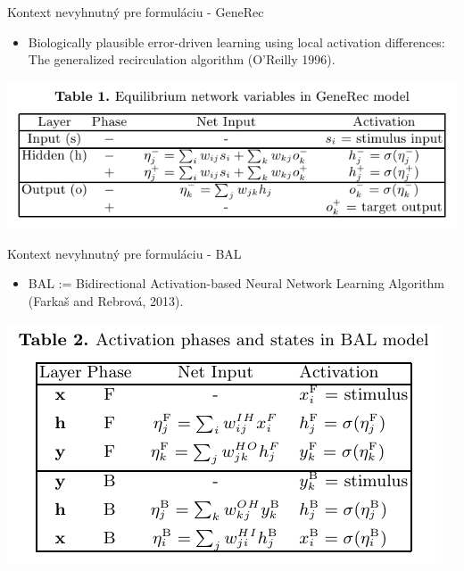 \documentclass[xcolor=dvipsnames]{beamer}
\begin{document}
\begin{frame}{Kontext nevyhnutný pre formuláciu - GeneRec}
  \begin{itemize} 
    \item Biologically plausible error-driven learning using local activation differences: The generalized recirculation algorithm (O'Reilly 1996).
  \end{itemize} 
  
  \begin{center} 
    \includegraphics[scale=0.5]{img/generec_activations.png}
  \end{center} 
\end{frame}


\begin{frame}{Kontext nevyhnutný pre formuláciu - BAL}
  \begin{itemize}
    \item BAL := Bidirectional Activation-based Neural Network Learning Algorithm (Farkaš and Rebrová, 2013).
  \end{itemize}
  
  \begin{center}
    \includegraphics[scale=0.5]{img/bal_activations.png}
  \end{center}  
\end{frame}
\end{document}
